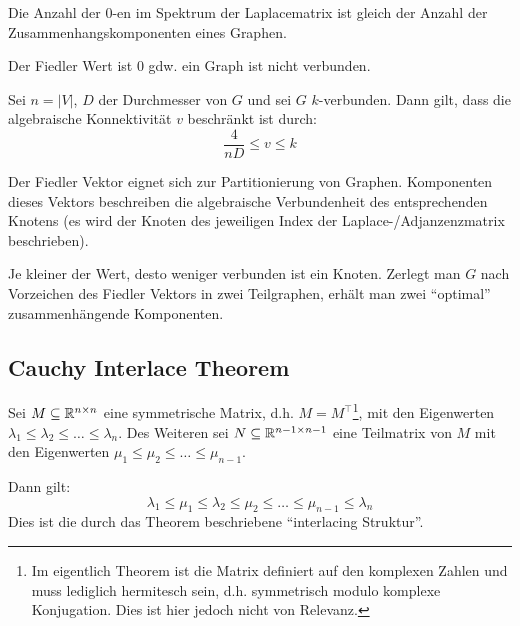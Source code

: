 \begin{proposition}
    Die Anzahl der 0-en im Spektrum der Laplacematrix ist gleich der Anzahl der Zusammenhangskomponenten eines Graphen.
\end{proposition}

\begin{corollary}
    Der Fiedler Wert ist 0 gdw. ein Graph ist nicht verbunden.
\end{corollary}

\begin{observation}
    Sei $ n = |V| $, $ D $ der Durchmesser von $ G $ und sei $ G $ $ k $-verbunden.
    Dann gilt, dass die algebraische Konnektivität $ v $ beschränkt ist durch:
    \begin{equation*}
        \frac{4}{nD} \leq v \leq k
    \end{equation*}
\end{observation}

\begin{observation}
    Der Fiedler Vektor eignet sich zur Partitionierung von Graphen.
    Komponenten dieses Vektors beschreiben die algebraische Verbundenheit des entsprechenden Knotens (es wird der Knoten des jeweiligen Index der Laplace-/Adjanzenzmatrix beschrieben).

    Je kleiner der Wert, desto weniger verbunden ist ein Knoten.
    Zerlegt man $ G $ nach Vorzeichen des Fiedler Vektors in zwei Teilgraphen, erhält man zwei ``optimal'' zusammenhängende Komponenten.
\end{observation}

\subsection{Cauchy Interlace Theorem}

\begin{theorem}
    \label{thm:interlace}
    Sei $ M \subseteq \mathbb{R}^{n \times n} $ eine symmetrische Matrix, d.h. $ M = M^\top $\footnote{%
        Im eigentlich Theorem ist die Matrix definiert auf den komplexen Zahlen und muss lediglich hermitesch sein, d.h. symmetrisch modulo komplexe Konjugation.
        Dies ist hier jedoch nicht von Relevanz.
    }, mit den Eigenwerten $ \lambda_1 \leq \lambda_2 \leq \dots \leq \lambda_n $.
    Des Weiteren sei $ N \subseteq \mathbb{R}^{n - 1 \times n - 1} $ eine Teilmatrix von $ M $ mit den Eigenwerten $ \mu_1 \leq \mu_2 \leq \dots \leq \mu_{n - 1} $.

    Dann gilt:
    \begin{equation*}
        \lambda_1 \leq \mu_1 \leq \lambda_2 \leq \mu_2 \leq \dots \leq \mu_{n - 1} \leq \lambda_n
    \end{equation*}
    Dies ist die durch das Theorem beschriebene ``interlacing Struktur''.
\end{theorem}

